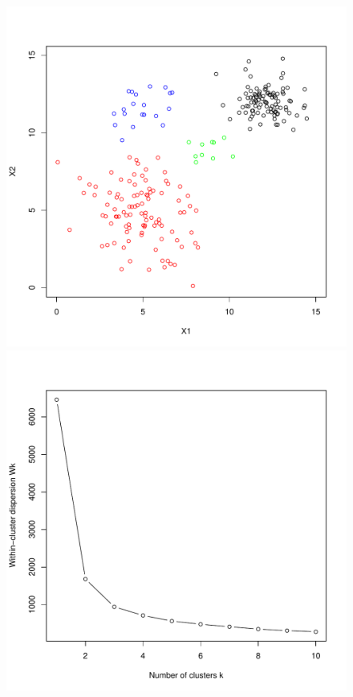 \documentclass[11pt]{article}
\begin{document}
\begin{figure}
\begin{minipage}{\linewidth}
\centering
\begin{minipage}{0.45\linewidth}
\includegraphics[width=\linewidth]{figure/Data_elbow.pdf}
\end{minipage}
\hspace{0.05in}
\begin{minipage}{0.45\linewidth}
\includegraphics[width=\linewidth]{figure/elbow.pdf}
\end{minipage}
\end{minipage}
\end{figure}
\\
\end{document}
